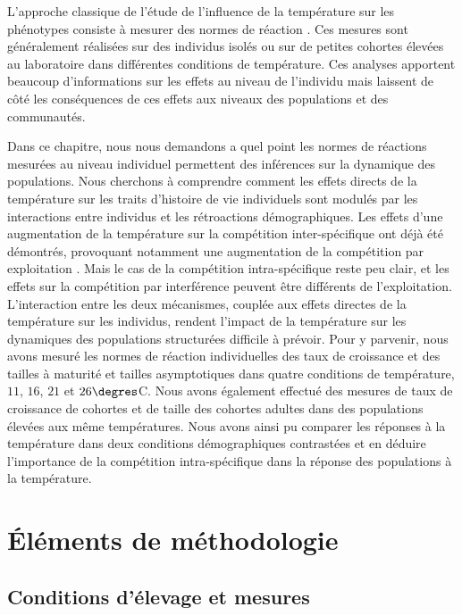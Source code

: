 L'approche classique de l'étude de l'influence de la température sur les
phénotypes consiste à mesurer des normes de réaction \autocites{woltereck1909a}.
Ces mesures sont généralement réalisées sur des individus isolés ou sur de
petites cohortes élevées au laboratoire dans différentes conditions de
température. Ces analyses apportent beaucoup d'informations sur les effets au
niveau de l'individu mais laissent de côté les conséquences de ces effets aux
niveaux des populations et des communautés. 

Dans ce chapitre, nous nous demandons a quel point les normes de réactions
mesurées au niveau individuel permettent des inférences sur la dynamique des
populations. Nous cherchons à comprendre comment les effets directs de la
température sur les traits d'histoire de vie individuels sont modulés par les
interactions entre individus et les rétroactions démographiques.
Les effets d'une augmentation de la température sur la compétition
inter-spécifique ont déjà été démontrés, provoquant notamment une augmentation
de la compétition par exploitation \autocites{ohlberger2011a}. Mais le cas de la
compétition intra-spécifique reste peu clair, et les effets sur la compétition par
interférence peuvent être différents de l'exploitation. L'interaction entre
les deux mécanismes, couplée aux effets directes de la température sur les individus,
rendent l'impact de la température sur les dynamiques des populations
structurées difficile à prévoir. Pour y parvenir, nous avons mesuré les normes de réaction
individuelles des taux de croissance et des tailles à maturité et tailles
asymptotiques dans quatre conditions de température, $11$, $16$, $21$ et
$26\degres$C. Nous avons également effectué des mesures de taux de croissance de
cohortes et de taille des cohortes adultes dans des populations élevées aux même
températures. Nous avons ainsi pu comparer les réponses à la température dans
deux conditions démographiques contrastées et en déduire l'importance de la
compétition intra-spécifique dans la réponse des populations à la température.

\section{Éléments de méthodologie}

\subsection{Conditions d'élevage et mesures}

